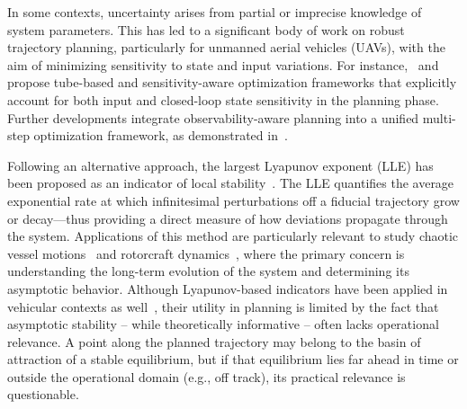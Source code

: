 In some contexts, uncertainty arises from partial or imprecise knowledge of system parameters. This has led to a significant body of work on robust trajectory planning, particularly for unmanned aerial vehicles (UAVs), with the aim of minimizing sensitivity to state and input variations. For instance,~\cite{Brault:RobustTrajectoryPlanning:2021} and~\cite{Giordano:TrajectoryGenerationMinimum:2018} propose tube-based and sensitivity-aware optimization frameworks that explicitly account for both input and closed-loop state sensitivity in the planning phase. Further developments integrate observability-aware planning into a unified multi-step optimization framework, as demonstrated in~\cite{Bohm:COPControlObservabilityaware:2022}.

Following an alternative approach, the largest Lyapunov exponent (LLE) has been proposed as an indicator of local stability~\cite{Meng:AnalysisGlobalCharacteristics:2022}. The LLE quantifies the average exponential rate at which infinitesimal perturbations off a fiducial trajectory grow or decay---thus providing a direct measure of how deviations propagate through the system.
Applications of this method are particularly relevant to study chaotic vessel motions~\cite{McCue:UseLyapunovExponents:2011} and rotorcraft dynamics~\cite{Tamer:StabilityNonlinearTimeDependent:2016,Cassoni:RotorcraftStabilityAnalysis:2024}, where the primary concern is understanding the long-term evolution of the system and determining its asymptotic behavior.
Although Lyapunov-based indicators have been applied in vehicular contexts as well~\cite{Sadri:StabilityAnalysisNonlinear:2013,Meng:AnalysisGlobalCharacteristics:2022}, their utility in planning is limited by the fact that asymptotic stability -- while theoretically informative -- often lacks operational relevance. A point along the planned trajectory may belong to the basin of attraction of a stable equilibrium, but if that equilibrium lies far ahead in time or outside the operational domain (e.g., off track), its practical relevance is questionable.

